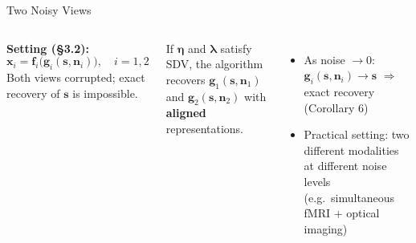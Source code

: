\documentclass[aspectratio=169, 10pt]{beamer}
\begin{document}
\begin{frame}{Two Noisy Views}
  \begin{columns}[T]
      \textbf{Setting (§3.2):}
      \[
        \mathbf{x}_i = \mathbf{f}_i\!\bigl(\mathbf{g}_i(\mathbf{s},\mathbf{n}_i)\bigr),\quad i=1,2
      \]
      Both views corrupted; exact recovery of $\mathbf{s}$ is impossible.

      \bigskip
      \begin{theorem}
        If $\boldsymbol{\eta}$ and $\boldsymbol{\lambda}$ satisfy SDV, the algorithm recovers
        $\mathbf{g}_1(\mathbf{s},\mathbf{n}_1)$ and $\mathbf{g}_2(\mathbf{s},\mathbf{n}_2)$
        with \textbf{aligned} representations.
      \end{theorem}

      \begin{itemize}
        \item As noise $\to 0$:\;
              $\mathbf{g}_i(\mathbf{s},\mathbf{n}_i)\to\mathbf{s}$\;
              $\Rightarrow$ exact recovery (Corollary 6)
        \item Practical setting: two different modalities at different noise levels
          (e.g.\ simultaneous fMRI + optical imaging)
      \end{itemize}

      \centering\vspace{0.8em}
  \end{columns}
\end{frame}
\end{document}
